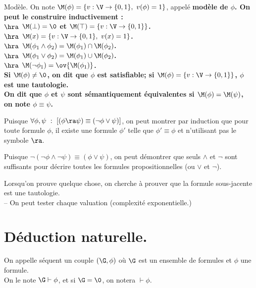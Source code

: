 \documentclass[french, 11pt]{article}
\begin{document}
\vspace*{-0.9cm}

\begin{defi}{Modèle.}{}
    On note $\M(\phi)=\{v:\V\to\{0,1\}, ~ v(\phi)=1\}$, appelé \bf{modèle} de $\phi$. On peut le construire inductivement :\\
    $\hra$ $\M(\bot)=\0$ et $\M(\top)=\{v:\V\to\{0,1\}\}$.\\
    $\hra$ $\M(x)=\{v:\V\to\{0,1\}, ~ v(x)=1\}$.\\
    $\hra$ $\M(\phi_1\land\phi_2)=\M(\phi_1)\cap\M(\phi_2)$.\\
    $\hra$ $\M(\phi_1\lor\phi_2)=\M(\phi_1)\cup\M(\phi_2)$.\\
    $\hra$ $\M(\lnot\phi_1)=\ov{\M(\phi_1)}$.\\
    Si $\M(\phi)\neq\0$, on dit que $\phi$ est \bf{satisfiable}; si $\M(\phi)=\{v:\V\to\{0,1\}\}$, $\phi$ est une \bf{tautologie}.\\
    On dit que $\phi$ et $\psi$ sont \bf{sémantiquement équivalentes} si $\M(\phi)=\M(\psi)$, on note $\phi\equiv\psi$.
\end{defi}

\begin{ex}{}{}
    Puisque $\forall \phi,\psi ~ : ~ \left[(\phi \ra \psi) \equiv (\lnot \phi \lor \psi)\right]$, on peut montrer par induction que pour toute formule $\phi$, il existe une formule $\phi'$ telle que $\phi'\equiv \phi$ et n'utilisant pas le symbole $\ra$.
\end{ex}

\vspace*{-0.8cm}

\begin{ex}{}{}
    Puisque $\lnot(\lnot \phi \land \lnot \psi) \equiv (\phi \lor \psi)$, on peut démontrer que seuls $\land$ et $\lnot$ sont suffisants pour décrire toutes les formules propositionnelles (ou $\lor$ et $\lnot$).
\end{ex}

Lorsqu'on prouve quelque chose, on cherche à prouver que la formule sous-jacente est une tautologie.\\
-- On peut tester chaque valuation (complexité exponentielle.)

\section{Déduction naturelle.}

\begin{defi}{}{}
    On appelle séquent un couple $(\G,\phi)$ où $\G$ est un ensemble de formules et $\phi$ une formule.\\
    On le note $\G\vdash\phi$, et si $\G=\0$, on notera $\vdash\phi$.
\end{defi}
\end{document}
